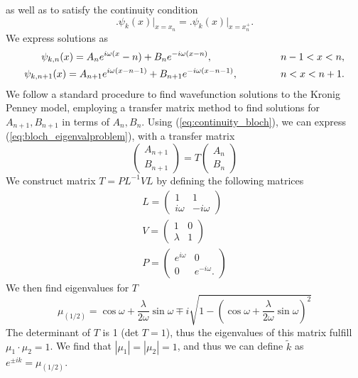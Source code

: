 %
as well as to satisfy the continuity condition
%
\begin{equation}\label{eq:continuity_bloch}
\biggl.\psi_{k}(x)\biggl|_{x=x_{n}}=\biggl.\psi_{k}(x)\biggr|_{x=x_{n}^{+}}.
\end{equation}
%
We express solutions as
%
\begin{align}
\psi_{k,n}(x) = A_n e^{i\omega(x}-n) + B_n e^{-i\omega(x-n)},\hspace{16ex} n-1 < x < n,\\
\psi_{k,n+1}(x) = A_{n+1} e^{i\omega(x-n-1)} + B_{n+1} e^{-i\omega(x-n-1)}, \hspace{10ex} n < x < n+1.
\end{align}
%
We follow a standard procedure to find wavefunction solutions to the Kronig Penney model, employing a transfer matrix method to find solutions for $A_{n+1}, B_{n+1}$ in terms of $A_n, B_n$. Using (\ref{eq:continuity_bloch}), we can express (\ref{eq:bloch_eigenvalproblem}), with a transfer matrix
%
\begin{equation}
 \begin{pmatrix}
 A_{n+1} \\ B_{n+1}
 \end{pmatrix}
 = T 
 \begin{pmatrix}
 A_n \\ B_n
 \end{pmatrix}
\end{equation}{}
%
We construct matrix $T=PL^{-1}VL$ by defining the following matrices 
%
\begin{align}
L = \begin{pmatrix}
1 & 1 \\
i\omega & -i\omega
\end{pmatrix} \\
%
V = \begin{pmatrix}
1 & 0 \\
\lambda & 1
\end{pmatrix} \\
%
P = \begin{pmatrix}
e^{i\omega} & 0 \\
0 & e^{-i\omega}.
\end{pmatrix}
\end{align} 
%
We then find eigenvalues for $T$
\begin{equation}
    \mu_{(1/2)} = \cos{\omega} + \frac{\lambda}{2\omega}\sin{\omega}\mp i \sqrt{1-\left(\cos{\omega} + \frac{\lambda}{2\omega}\sin{\omega}\right)^2}
\end{equation}
%
The determinant of $T$ is 1 (det $T = 1$), thus the eigenvalues of this matrix fulfill $\mu_1 \cdot \mu_2 = 1$. We find that $|\mu_1| = |\mu_2|=1$, and thus we can define $\tilde{k}$ as $e^{\pm ik} = \mu_{(1/2)}$.\\
